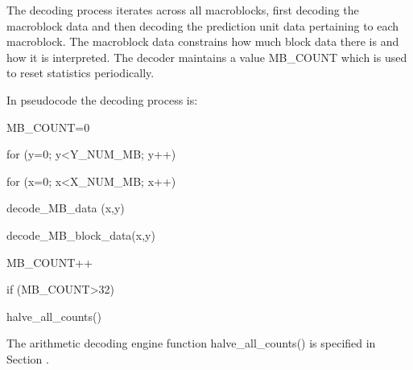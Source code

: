 The decoding process iterates across all macroblocks, first decoding the
macroblock data and then decoding the prediction unit data pertaining to
each macroblock. The macroblock data constrains how much block data
there is and how it is interpreted. The decoder maintains a value
MB\_COUNT which is used to reset statistics periodically.

In pseudocode the decoding process is:

MB\_COUNT=0

for (y=0;  y<Y\_NUM\_MB;  y++)

{

    for (x=0;  x<X\_NUM\_MB;  x++)

    {

          decode\_MB\_data (x,y)

          decode\_MB\_block\_data(x,y)

          MB\_COUNT++

          if (MB\_COUNT>32)

              halve\_all\_counts()

    }

}

The arithmetic decoding engine function halve\_all\_counts() is specified
in Section .


